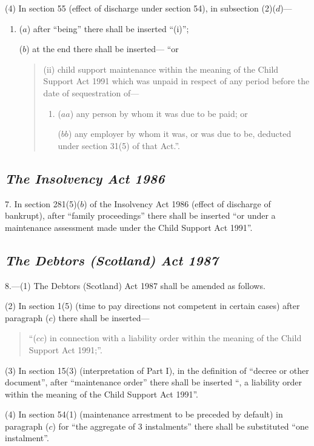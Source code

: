 \documentclass[12pt,a4paper]{article}
\begin{document}
(4) In section 55 (effect of discharge under section 54), in subsection (2)($d$)—
\begin{enumerate}\item[]
($a$) after “being” there shall be inserted “(i)”;

($b$) at the end there shall be inserted— “or
\begin{quotation}
(ii) child support maintenance within the meaning of the Child Support Act 1991 which was unpaid in respect of any period before the date of sequestration of—
\begin{enumerate}\item[]
($aa$) any person by whom it was due to be paid; or

($bb$) any employer by whom it was, or was due to be, deducted under section 31(5)  of that Act.”.
\end{enumerate}
\end{quotation}
\end{enumerate}

\subsection*{\itshape The Insolvency Act 1986}

7. In section 281(5)($b$)  of the Insolvency Act 1986 (effect of discharge of bankrupt), after “family proceedings” there shall be inserted “or under a maintenance assessment made under the Child Support Act 1991”.

\subsection*{\itshape The Debtors (Scotland) Act 1987}

8.---(1) The Debtors (Scotland) Act 1987 shall be amended as follows.

(2) In section 1(5)  (time to pay directions not competent in certain cases) after paragraph ($c$)  there shall be inserted—
\begin{quotation}
“($cc$) in connection with a liability order within the meaning of the Child Support Act 1991;”.
\end{quotation}

(3) In section 15(3)  (interpretation of Part I), in the definition of “decree or other document”, after “maintenance order” there shall be inserted “, a liability order within the meaning of the Child Support Act 1991”.

(4) In section 54(1)  (maintenance arrestment to be preceded by default) in paragraph ($c$)  for “the aggregate of 3 instalments” there shall be substituted “one instalment”.
\end{document}

